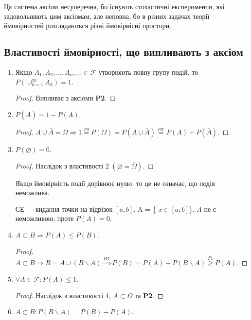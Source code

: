 Ця система аксіом несуперечна, бо існують стохастичні експерименти,
які задовольняють цим аксіомам, але неповна, бо в різних задачах
теорії ймовірностей розглядаються різні ймовірнісні простори.

\subsection{Властивості ймовірності, що випливають з аксіом}
\begin{enumerate}
    \item Якщо $A_1, A_2, ..., A_n, ... \in \mathcal{F}$ утворюють повну групу 
    подій, то $P(\cup_{k=1}^\infty A_k) = 1$.
    \begin{proof}
        Випливає з аксіоми \textbf{P2}.
    \end{proof}
    \item $P(\overline{A}) = 1 - P(A)$.
    \begin{proof}
        $A \cup \overline{A} = \Omega \Rightarrow 1 \overset{P2}{=} P(\Omega) 
        = P(A \cup \overline{A}) \overset{P3'}{=} P(A) + P(\overline{A})$.
    \end{proof}
    \item $P(\varnothing) = 0$.
    \begin{proof}
        Наслідок з властивості 2 $(\varnothing = \overline{\Omega})$.
    \end{proof}
    \begin{remark}
        Якщо ймовірність події дорівнює нулю, то це не означає, що подія неможлива.
    \end{remark}
    \begin{example}
        СЕ --- кидання точки на відрізок $[a, b]$. A = \{ $x \in [a; b]$\}. $A$ не є неможливою, проте $P(A) = 0$.
    \end{example}
    \item $A \subset B \Rightarrow P(A) \leq P(B)$.
    \begin{proof}
        $A \subset B \Rightarrow B = A \cup (B \backslash A) 
        \overset{P3'}{\Rightarrow} P(B) = P(A) + P(B \backslash A) 
        \overset{P1}{\geq} P(A)$.
    \end{proof}
    \item $\forall A \in \mathcal{F}: P(A) \leq 1$.
    \begin{proof}
        Наслідок з властивості 4, $A \subset \Omega$ та \textbf{P2}.
    \end{proof}
    \item $A \subset B: P(B \backslash A) = P(B) - P(A)$.

\end{enumerate}
